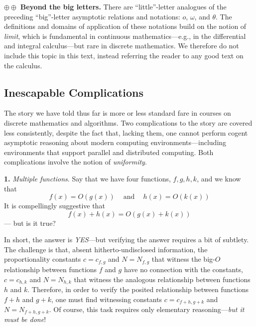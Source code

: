 \noindent $\oplus \oplus$ {\bf Beyond the big letters.}
There are ``little''-letter analogues of the preceding ``big''-letter asymptotic relations and notations: $o$, $\omega$, and $\theta$.  The definitions and domains of application of these notations build on the notion of {\it limit}, which is fundamental in continuous mathematics---e.g., in the differential and integral calculus---but rare in discrete mathematics.  We therefore do not include this topic in this text, instead referring the reader to any good text on the calculus.

\subsection{Inescapable Complications}
\label{sec:asymptotic-complication}

The story we have told thus far is more or less standard fare in courses on discrete mathematics and algorithms.  Two complications to the story are covered less consistently, despite the fact that, lacking them, one cannot perform cogent asymptotic reasoning about modern computing
environments---including environments that support parallel and distributed computing.  Both complications involve the notion of {\em uniformity}. 

\medskip

\noindent
{\bf 1.} {\em Multiple functions}.
Say that we have four functions, $f, g, h, k$, and we know that
\[ f(x) = O(g(x)) \ \ \ \  \mbox{ and } \ \ \ \ h(x) = O(k(x)) \]
It is compellingly suggestive that
\[ f(x) + h(x) = O(g(x) + k(x)) \]
--- but is it true?

\smallskip

In short, the answer is {\em YES}---but verifying the answer requires a bit of subtlety.  The challenge is that, absent hitherto-undisclosed information, the proportionality constants $c = c_{f,g}$ and $N = N_{f,g}$ that witness the big-$O$ relationship between functions $f$ and $g$ have no connection with the constants, $c = c_{h,k}$ and $N = N_{h,k}$ that witness the analogous relationship between functions $h$ and $k$.  Therefore, in order to verify the posited relationship between functions $f + h$ and $g + k$, one must find witnessing constants $c = c_{f+h, g+k}$ and $N = N_{f+h,g+k}$.  Of course, this task requires only elementary reasoning---{\em but it must be done}!

\bigskip


